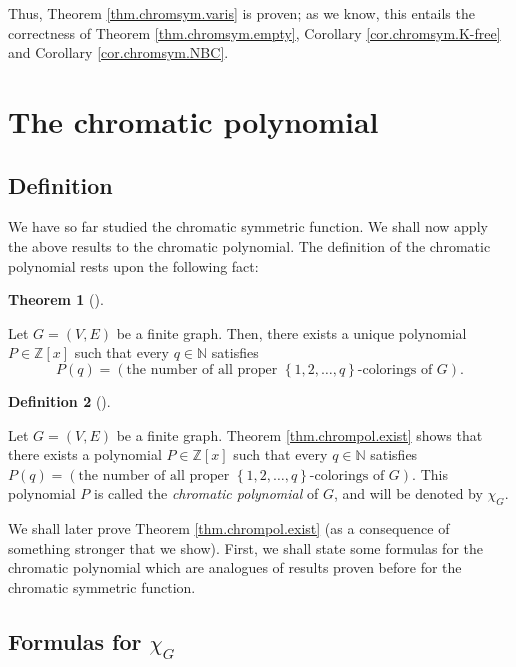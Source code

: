 \documentclass[numbers=enddot,12pt,final,onecolumn,notitlepage]{scrartcl}%
\theoremstyle{definition}
\newtheorem{theo}{Theorem}[section]
\newenvironment{theorem}[1][]
{\begin{theo}[#1]\begin{leftbar}}
{\end{leftbar}\end{theo}}
\newtheorem{defi}[theo]{Definition}
\newenvironment{definition}[1][]
{\begin{defi}[#1]\begin{leftbar}}
{\end{leftbar}\end{defi}}
\begin{document}
Thus, Theorem \ref{thm.chromsym.varis} is proven; as we know, this entails the
correctness of Theorem \ref{thm.chromsym.empty}, Corollary
\ref{cor.chromsym.K-free} and Corollary \ref{cor.chromsym.NBC}.

\section{\label{sec.chrompol}The chromatic polynomial}

\subsection{Definition}

We have so far studied the chromatic symmetric function. We shall now apply
the above results to the chromatic polynomial. The definition of the chromatic
polynomial rests upon the following fact:

\begin{theorem}
\label{thm.chrompol.exist}Let $G=\left(  V,E\right)  $ be a finite graph.
Then, there exists a unique polynomial $P\in\mathbb{Z}\left[  x\right]  $ such
that every $q\in\mathbb{N}$ satisfies%
\[
P\left(  q\right)  =\left(  \text{the number of all proper }\left\{
1,2,\ldots,q\right\}  \text{-colorings of }G\right)  .
\]

\end{theorem}

\begin{definition}
\label{def.chrompol}Let $G=\left(  V,E\right)  $ be a finite graph. Theorem
\ref{thm.chrompol.exist} shows that there exists a polynomial $P\in
\mathbb{Z}\left[  x\right]  $ such that every $q\in\mathbb{N}$ satisfies
$P\left(  q\right)  =\left(  \text{the number of all proper }\left\{
1,2,\ldots,q\right\}  \text{-colorings of }G\right)  $. This polynomial $P$ is
called the \emph{chromatic polynomial} of $G$, and will be denoted by
$\chi_{G}$.
\end{definition}

We shall later prove Theorem \ref{thm.chrompol.exist} (as a consequence of
something stronger that we show). First, we shall state some formulas for the
chromatic polynomial which are analogues of results proven before for the
chromatic symmetric function.

\subsection{Formulas for $\chi_{G}$}
\end{document}
